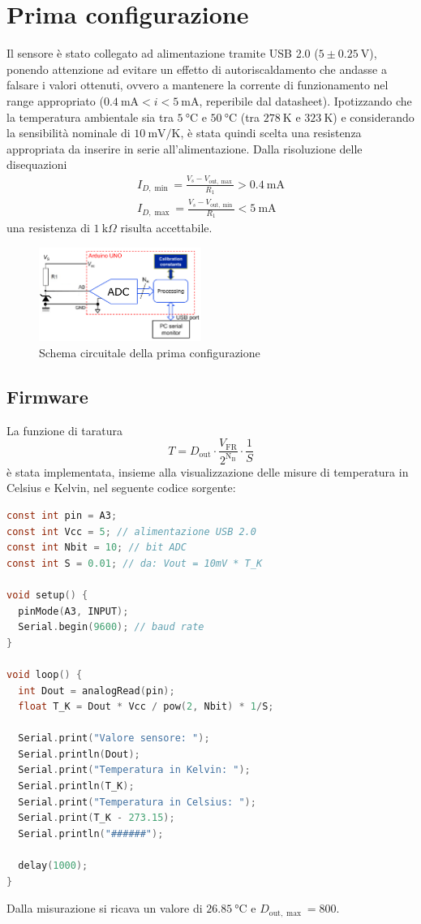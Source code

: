 \documentclass{article}
\begin{document}
\section{Prima configurazione}
Il sensore è stato collegato ad alimentazione tramite USB 2.0 ($5 \pm \SI{0.25}{\volt}$), ponendo attenzione ad evitare un effetto di autoriscaldamento che andasse a falsare i valori ottenuti, ovvero a mantenere la corrente di funzionamento nel range appropriato ($\SI{0.4}{\milli\ampere}<i<\SI{5}{\milli\ampere}$, reperibile dal datasheet). 
Ipotizzando che la temperatura ambientale sia tra $\SI{5}{\celsius}$ e $\SI{50}{\celsius}$ (tra $\SI{278}{\kelvin}$ e $\SI{323}{\kelvin}$) e considerando la sensibilità nominale di $\SI{10}{\milli\volt\per\kelvin}$, è stata quindi scelta una resistenza appropriata da inserire in serie all'alimentazione. Dalla risoluzione delle disequazioni
\begin{align*}
    I_{D,\min}=\frac{V_s-V_{\text{out}, \max}}{R_1} > \SI{0.4}{\milli\ampere}\\
    I_{D,\max}=\frac{V_s-V_{\text{out}, \min}}{R_1} < \SI{5}{\milli\ampere}
\end{align*}
una resistenza di $\SI{1}{\kilo\Omega}$ risulta accettabile.
\begin{figure}[H]
    \centering\includegraphics[width=200px]{img/circuito_1.png}
    \caption{Schema circuitale della prima configurazione}
\end{figure}

\subsection{Firmware}
La funzione di taratura
\begin{equation*}
    T=D_{\text{out}}\cdot\frac{V_{\text{FR}}}{2^{\text{N}_\text{B}}}\cdot\frac{1}{S}
\end{equation*}
è stata implementata, insieme alla visualizzazione delle misure di temperatura in Celsius e Kelvin, nel seguente codice sorgente:
\begin{lstlisting}[language=C]
const int pin = A3;
const int Vcc = 5; // alimentazione USB 2.0
const int Nbit = 10; // bit ADC
const int S = 0.01; // da: Vout = 10mV * T_K

void setup() {
  pinMode(A3, INPUT);
  Serial.begin(9600); // baud rate
}

void loop() {
  int Dout = analogRead(pin); 
  float T_K = Dout * Vcc / pow(2, Nbit) * 1/S; 

  Serial.print("Valore sensore: ");
  Serial.println(Dout);
  Serial.print("Temperatura in Kelvin: ");
  Serial.println(T_K);
  Serial.print("Temperatura in Celsius: ");
  Serial.print(T_K - 273.15);
  Serial.println("######");

  delay(1000);
}
\end{lstlisting}
Dalla misurazione si ricava un valore di $\SI{26.85}{\celsius}$ e $D_{\text{out}, \max}=800$.
\end{document}
